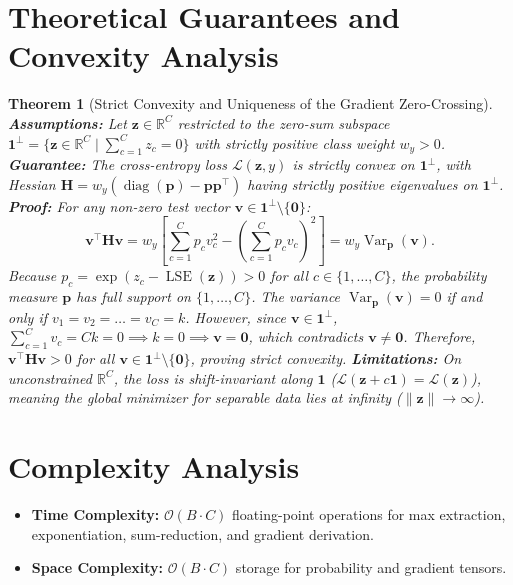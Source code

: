 \documentclass[11pt]{article}
\newtheorem{theorem}{Theorem}
\begin{document}
\section{Theoretical Guarantees and Convexity Analysis}
\label{sec:guarantees}

\begin{theorem}[Strict Convexity and Uniqueness of the Gradient Zero-Crossing]
\label{thm:ce_convexity_rigorous}
\textbf{Assumptions:} Let $\mathbf{z} \in \mathbb{R}^C$ restricted to the zero-sum subspace $\mathbf{1}^\perp = \{\mathbf{z} \in \mathbb{R}^C \mid \sum_{c=1}^C z_c = 0\}$ with strictly positive class weight $w_y > 0$.
\textbf{Guarantee:} The cross-entropy loss $\mathcal{L}(\mathbf{z}, y)$ is strictly convex on $\mathbf{1}^\perp$, with Hessian $\mathbf{H} = w_y (\operatorname{diag}(\mathbf{p}) - \mathbf{p}\mathbf{p}^\top)$ having strictly positive eigenvalues on $\mathbf{1}^\perp$.
\textbf{Proof:}
For any non-zero test vector $\mathbf{v} \in \mathbf{1}^\perp \setminus \{\mathbf{0}\}$:
\begin{equation}
\mathbf{v}^\top \mathbf{H} \mathbf{v} = w_y \left[ \sum_{c=1}^C p_c v_c^2 - \left(\sum_{c=1}^C p_c v_c\right)^2 \right] = w_y \operatorname{Var}_{\mathbf{p}}(\mathbf{v}).
\end{equation}
Because $p_c = \exp(z_c - \operatorname{LSE}(\mathbf{z})) > 0$ for all $c \in \{1, \dots, C\}$, the probability measure $\mathbf{p}$ has full support on $\{1, \dots, C\}$. The variance $\operatorname{Var}_{\mathbf{p}}(\mathbf{v}) = 0$ if and only if $v_1 = v_2 = \dots = v_C = k$. However, since $\mathbf{v} \in \mathbf{1}^\perp$, $\sum_{c=1}^C v_c = C k = 0 \implies k = 0 \implies \mathbf{v} = \mathbf{0}$, which contradicts $\mathbf{v} \neq \mathbf{0}$. Therefore, $\mathbf{v}^\top \mathbf{H} \mathbf{v} > 0$ for all $\mathbf{v} \in \mathbf{1}^\perp \setminus \{\mathbf{0}\}$, proving strict convexity.
\textbf{Limitations:} On unconstrained $\mathbb{R}^C$, the loss is shift-invariant along $\mathbf{1}$ ($\mathcal{L}(\mathbf{z} + c\mathbf{1}) = \mathcal{L}(\mathbf{z})$), meaning the global minimizer for separable data lies at infinity ($\|\mathbf{z}\| \to \infty$).
\end{theorem}

\section{Complexity Analysis}
\label{sec:complexity}

\begin{itemize}
    \item \textbf{Time Complexity:} $\mathcal{O}(B \cdot C)$ floating-point operations for max extraction, exponentiation, sum-reduction, and gradient derivation.
    \item \textbf{Space Complexity:} $\mathcal{O}(B \cdot C)$ storage for probability and gradient tensors.
\end{itemize}
\end{document}
